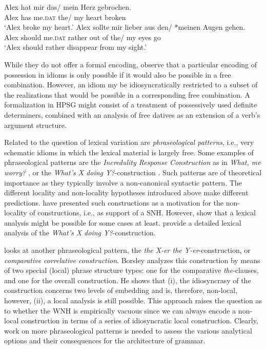 \documentclass[output=paper]{langsci/langscibook}
\begin{document}
\eal \label{ex-herz-augen}
\ex 
\gll Alex hat mir das/ mein Herz gebrochen.\\
Alex has me.\textsc{dat} the/ my heart broken\\
\glt `Alex broke my heart.'\label{ex-herz}
\ex 
\gll Alex sollte mir lieber aus den/ *meinen Augen gehen.\\
Alex should me.\textsc{dat} rather {out of} the/ my eyes go\\
\glt `Alex should rather disappear from my sight.'\label{ex-augen}
\zl 

While they do not offer a formal encoding, \cite{Markantonatou:Sailer:16} observe that a particular encoding of possession in idioms is only possible if it would also be possible in a free combination. However, an idiom my be idiosyncratically restricted to a subset of the realizations that would be possible in a corresponding free combination. A formalization in HPSG might consist of a treatment of possessively used definite determiners, combined with an analysis of free datives as an extension of a verb's argument structure.

 

\bigskip%
Related to the question of lexical variation are \emph{phraseological patterns}, i.e., very schematic idioms 
in which the lexical material is largely free. Some examples 
of phraseological patterns are
  the \emph{Incredulity Response Construction} as in \emph{What, me worry?} \citep{Akmajian:84,Lambrecht:90}, 
or the \emph{What's X doing Y?}-construction \citep{KF99a}.
Such patterns are of theoretical importance as they typically involve a non-canonical syntactic pattern. 
The different locality and non-locality hypotheses introduced above make different predictions. 
\cite{FKoC88a} have presented such constructions as a motivation for the non-locality of constructions, i.e., as support of a SNH. However, \cite{KF99a} show that a lexical analysis might be possible for some cases at least. 
\citeauthor{KF99a} provide a detailed lexical analysis of the \emph{What's X doing Y?}-construction. 

\cite{Borsley:04} looks at another phraseological pattern, the \emph{the X-er the Y-er}-construction, or \emph{comparative correlative construction}.
Borsley analyzes this construction by means of two special (local) phrase structure types: one for the comparative \emph{the}-clauses, and one for the overall construction. He shows that (i), the idiosyncrasy of the construction concerns two levels of embedding and is, therefore, non-local, however, (ii),
a local analysis is still possible. This approach raises the question as to whether the WNH is empirically vacuous since we can always encode a non-local construction in terms of a series of idiosyncratic local construction. 
Clearly, work on more phraseological patterns is needed to assess the various analytical options and their consequences for the architecture of grammar.
\end{document}
